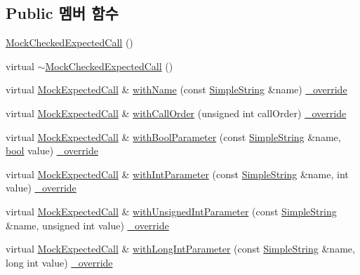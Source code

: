 \subsection*{Public 멤버 함수}
\begin{DoxyCompactItemize}
\item 
\hyperlink{class_mock_checked_expected_call_a8893d443e5cee5e1edfb46c2132e8319}{Mock\+Checked\+Expected\+Call} ()
\item 
virtual \hyperlink{class_mock_checked_expected_call_aedcab4c121e2f86fc9729f4ac5be1dde}{$\sim$\+Mock\+Checked\+Expected\+Call} ()
\item 
virtual \hyperlink{class_mock_expected_call}{Mock\+Expected\+Call} \& \hyperlink{class_mock_checked_expected_call_a956e88393edbb7f7427eecb56ac5e317}{with\+Name} (const \hyperlink{class_simple_string}{Simple\+String} \&name) \hyperlink{_cpp_u_test_config_8h_a049bea15dd750e15869863c94c1efc3b}{\+\_\+override}
\item 
virtual \hyperlink{class_mock_expected_call}{Mock\+Expected\+Call} \& \hyperlink{class_mock_checked_expected_call_a4406dd9a38b0a29197dcde6a4c5c2289}{with\+Call\+Order} (unsigned int call\+Order) \hyperlink{_cpp_u_test_config_8h_a049bea15dd750e15869863c94c1efc3b}{\+\_\+override}
\item 
virtual \hyperlink{class_mock_expected_call}{Mock\+Expected\+Call} \& \hyperlink{class_mock_checked_expected_call_a49e02522fe64e0e974cb7d91648e39c3}{with\+Bool\+Parameter} (const \hyperlink{class_simple_string}{Simple\+String} \&name, \hyperlink{avb__gptp_8h_af6a258d8f3ee5206d682d799316314b1}{bool} value) \hyperlink{_cpp_u_test_config_8h_a049bea15dd750e15869863c94c1efc3b}{\+\_\+override}
\item 
virtual \hyperlink{class_mock_expected_call}{Mock\+Expected\+Call} \& \hyperlink{class_mock_checked_expected_call_a1a63a585050f40a7e76421bcaf30e689}{with\+Int\+Parameter} (const \hyperlink{class_simple_string}{Simple\+String} \&name, int value) \hyperlink{_cpp_u_test_config_8h_a049bea15dd750e15869863c94c1efc3b}{\+\_\+override}
\item 
virtual \hyperlink{class_mock_expected_call}{Mock\+Expected\+Call} \& \hyperlink{class_mock_checked_expected_call_a288909ec68852675078e0c46afcc53fe}{with\+Unsigned\+Int\+Parameter} (const \hyperlink{class_simple_string}{Simple\+String} \&name, unsigned int value) \hyperlink{_cpp_u_test_config_8h_a049bea15dd750e15869863c94c1efc3b}{\+\_\+override}
\item 
virtual \hyperlink{class_mock_expected_call}{Mock\+Expected\+Call} \& \hyperlink{class_mock_checked_expected_call_aee54849bed7bd0d7e9466ad9f70d56e3}{with\+Long\+Int\+Parameter} (const \hyperlink{class_simple_string}{Simple\+String} \&name, long int value) \hyperlink{_cpp_u_test_config_8h_a049bea15dd750e15869863c94c1efc3b}{\+\_\+override}

\end{DoxyCompactItemize}
